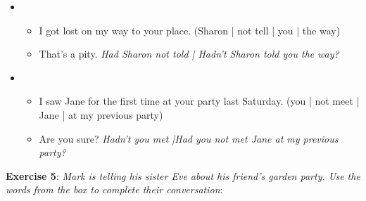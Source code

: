 \begin{itemize}
\item
\begin{itemize}
\item I got lost on my way to your place. (Sharon | not tell | you | the way)
\item That's a pity. \textit{Had Sharon not told | Hadn't Sharon told you the way?}
\end{itemize}

\item
\begin{itemize}
\item I saw Jane for the first time at your party last Saturday. (you | not meet | Jane | at my previous party)
\item Are you sure? \textit{Hadn't you met |Had you not met Jane at my previous party?}
\end{itemize}

\end{itemize}

\textbf{Exercise 5}: \textit{Mark is telling his sister Eve about his friend's garden party. Use the words from the box to complete their conversation}:

